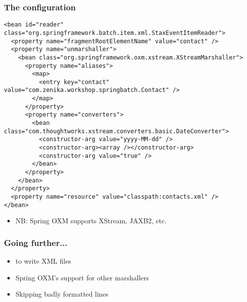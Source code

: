 \begin{frame}[fragile]
 \frametitle{The  configuration}

\lstset{language=XML}
\begin{lstlisting}
<bean id="reader" class="org.springframework.batch.item.xml.StaxEventItemReader">
  <property name="fragmentRootElementName" value="contact" />
  <property name="unmarshaller">
    <bean class="org.springframework.oxm.xstream.XStreamMarshaller">
      <property name="aliases">
        <map>
          <entry key="contact" value="com.zenika.workshop.springbatch.Contact" />
        </map>
      </property>
      <property name="converters">
        <bean class="com.thoughtworks.xstream.converters.basic.DateConverter">
          <constructor-arg value="yyyy-MM-dd" />
          <constructor-arg><array /></constructor-arg>
          <constructor-arg value="true" />
        </bean>
      </property>
    </bean>
  </property>
  <property name="resource" value="classpath:contacts.xml" />
</bean>
\end{lstlisting}
  \begin{itemize}
    \item NB: Spring OXM supports XStream, JAXB2, etc. 
  \end{itemize}
\end{frame}

\begin{frame}
 \frametitle{Going further...}
 \begin{itemize}
  \item {} to write XML files
  \item Spring OXM's support for other marshallers
  \item Skipping badly formatted lines
 \end{itemize}
\end{frame}